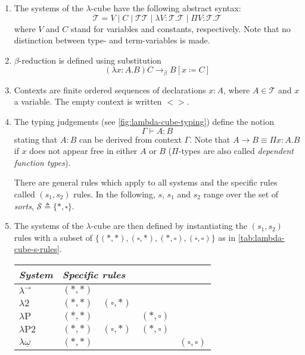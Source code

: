 \documentclass[12pt,toc=bibliography,numbers=noendperiod,
               footnotes=multiple,twoside]{scrartcl}
\begin{document}
\begin{enumerate}
\item The systems of the \(\lambda\)-cube have the following abstract syntax: \[\mathcal{T} = V \;|\; C \;|\; \mathcal{T}\mathcal{T} \;|\; \lambda V\!\!:\!\mathcal{T}\!.\mathcal{T} \;|\; \Pi V\!\!:\!\mathcal{T}\!.\mathcal{T}\] where \(V\) and \(C\) stand for variables and constants, respectively. Note that no distinction between type- and term-variables is made.
\item \(\beta\)-reduction is defined using substitution \[(\lambda x:A.B)C \rightarrow_\beta B[x \coloneqq C]\]
\item Contexts are finite ordered sequences of declarations \(x:A\), where \(A \in \mathcal{T}\) and \(x\) a variable. The empty context is written \(<>\).
\item The typing judgements (see \cref{fig:lambda-cube-typing}) define the notion \[\Gamma \vdash A:B\] stating that \(A:B\) can be derived from context \(\Gamma\). Note that \(A \rightarrow B \equiv \Pi x:A.B\) if \(x\) does not appear free in either \(A\) or \(B\) (\(\Pi\)-types are also called \emph{dependent function types}).

There are general rules which apply to all systems and the specific rules called \((s_1, s_2)\) rules. In the following, \(s\), \(s_1\) and \(s_2\) range over the set of \emph{sorts}, \(\mathcal{S} \triangleq \{*, \square\}\).
\item The systems of the \(\lambda\)-cube are then defined by instantiating the \((s_1, s_2)\) rules with a subset of \(\{(*,*), (\square, *), (*,\square), (\square, \square)\}\) as in \cref{tab:lambda-cube-s-rules}.

\begin{table}[h]
    \centering
    \begin{tabular}{l l l l l}
        \toprule
        \textit{System} & \multicolumn{4}{l}{\textit{Specific rules}}  \\
        \midrule
        \(\lambda^{\rightarrow}\) & \((*,*)\) & & & \\
        \(\lambda\textrm{2}\) & \((*,*)\) & \((\square, *)\) & & \\
        \(\lambda\textrm{P}\) & \((*,*)\) & & \((*,\square)\) & \\

        \(\lambda\textrm{P2}\) & \((*,*)\) & \((\square, *)\) & \((*,\square)\) & \\

        \(\lambda\underline{\omega}\) & \((*,*)\) & & & \((\square, \square)\) \\


\end{tabular}
\end{table}
\end{enumerate}
\end{document}
